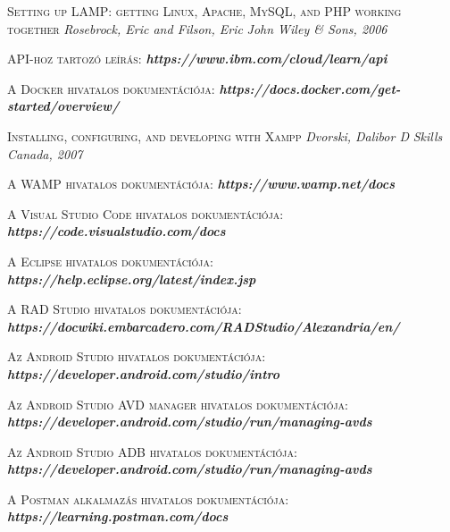 \documentclass[
]{thesis-ekf}
\theoremstyle{definition}
\theoremstyle{remark}
\begin{document}
\begin{thebibliography}{2}

\textsc{Setting up LAMP: getting Linux, Apache, MySQL, and PHP working together}
\newline
\emph{Rosebrock, Eric and Filson, Eric}
\emph{John Wiley \& Sons, 2006}

\textsc{API-hoz tartozó leírás:}
\newline
\emph{\bf{https://www.ibm.com/cloud/learn/api}}

\textsc{A Docker hivatalos dokumentációja:}
\newline
\emph{\bf{https://docs.docker.com/get-started/overview/}}

\textsc{Installing, configuring, and developing with Xampp}
\newline
\emph{Dvorski, Dalibor D}
\emph{Skills Canada, 2007}

\textsc{A WAMP hivatalos dokumentációja:}
\newline
\emph{\bf{https://www.wamp.net/docs}}

\textsc{A Visual Studio Code hivatalos dokumentációja:}
\newline
\emph{\bf{https://code.visualstudio.com/docs}}

\textsc{A Eclipse hivatalos dokumentációja:}
\newline
\emph{\bf{https://help.eclipse.org/latest/index.jsp}}

\textsc{A RAD Studio hivatalos dokumentációja:}
\newline
\emph{\bf{https://docwiki.embarcadero.com/RADStudio/Alexandria/en/}}

\textsc{Az Android Studio hivatalos dokumentációja:}
\newline
\emph{\bf{https://developer.android.com/studio/intro}}

\textsc{Az Android Studio AVD manager hivatalos dokumentációja:}
\newline
\emph{\bf{https://developer.android.com/studio/run/managing-avds}}

\textsc{Az Android Studio ADB hivatalos dokumentációja:}
\newline
\emph{\bf{https://developer.android.com/studio/run/managing-avds}}

\textsc{A Postman alkalmazás hivatalos dokumentációja:}
\newline
\emph{\bf{https://learning.postman.com/docs}}


\end{thebibliography}
\end{document}
